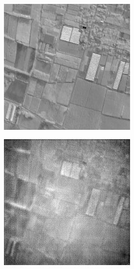 \begin{figure}
    \centering
    \begin{subfigure}[b]{0.19\textwidth}
        \centering
        \includegraphics[width=\textwidth]{../figs/outputs/pan/24.png}
    \end{subfigure}
    \hfill
    \begin{subfigure}[b]{0.19\textwidth}
        \centering
        \includegraphics[width=\textwidth]{../figs/outputs/cycleGan/24.png}

\end{subfigure}
\end{figure}
